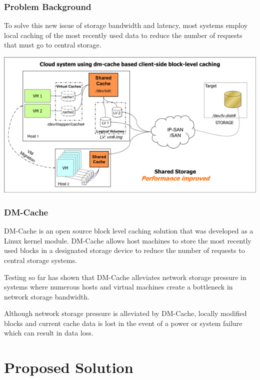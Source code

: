\documentclass{beamer}
\begin{document}
\begin{frame}
  \frametitle{Problem Background}

  To solve this new issue of storage bandwidth and latency, most
  systems employ local caching of the most recently used data to
  reduce the number of requests that must go to central storage.

  \begin{center}
    \includegraphics[scale=0.75]{../Images/NewerImage.png}
  \end{center}

\end{frame}

\begin{frame}
  \frametitle{DM-Cache}

  DM-Cache is an open source block level caching solution that was
  developed as a Linux kernel module. DM-Cache allows host machines to
  store the most recently used blocks in a designated storage device
  to reduce the number of requests to central storage systems.

  Testing so far has shown that DM-Cache alleviates network storage
  pressure in systems where numerous hosts and virtual machines create
  a bottleneck in network storage bandwidth.

  Although network storage pressure is alleviated by DM-Cache, locally
  modified blocks and current cache data is lost in the event of a
  power or system failure which can result in data loss.

\end{frame}



\section{Proposed Solution}
\end{document}
